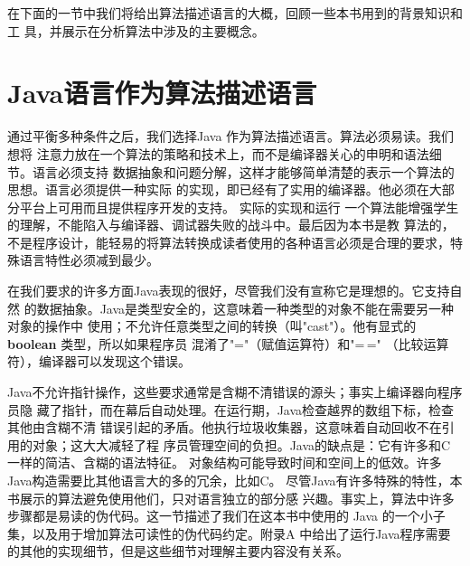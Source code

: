 在下面的一节中我们将给出算法描述语言的大概，回顾一些本书用到的背景知识和工
具，并展示在分析算法中涉及的主要概念。

\section{\textbf{Java}语言作为算法描述语言}
通过平衡多种条件之后，我们选择Java
作为算法描述语言。算法必须易读。我们想将
注意力放在一个算法的策略和技术上，而不是编译器关心的申明和语法细节。语言必须支持
数据抽象和问题分解，这样才能够简单清楚的表示一个算法的思想。语言必须提供一种实际
的实现，即已经有了实用的编译器。他必须在大部分平台上可用而且提供程序开发的支持。
实际的实现和运行
一个算法能增强学生的理解，不能陷入与编译器、调试器失败的战斗中。最后因为本书是教
算法的，不是程序设计，能轻易的将算法转换成读者使用的各种语言必须是合理的要求，特
殊语言特性必须减到最少。

在我们要求的许多方面Java表现的很好，尽管我们没有宣称它是理想的。它支持自然
的数据抽象。Java是类型安全的，这意味着一种类型的对象不能在需要另一种对象的操作中
使用；不允许任意类型之间的转换（叫"cast"）。他有显式的\textbf{boolean}
类型，所以如果程序员 混淆了"="（赋值运算符）和"=\,="
（比较运算符），编译器可以发现这个错误。

Java不允许指针操作，这些要求通常是含糊不清错误的源头；事实上编译器向程序员隐
藏了指针，而在幕后自动处理。在运行期，Java检查越界的数组下标，检查其他由含糊不清
错误引起的矛盾。他执行垃圾收集器，这意味着自动回收不在引用的对象；这大大减轻了程
序员管理空间的负担。Java的缺点是：它有许多和C一样的简洁、含糊的语法特征。
对象结构可能导致时间和空间上的低效。许多Java构造需要比其他语言大的多的冗余，比如C。
尽管Java有许多特殊的特性，本书展示的算法避免使用他们，只对语言独立的部分感
兴趣。事实上，算法中许多步骤都是易读的伪代码。这一节描述了我们在这本书中使用的
Java 的一个小子集，以及用于增加算法可读性的伪代码约定。附录A
中给出了运行Java程序需要的其他的实现细节，但是这些细节对理解主要内容没有关系。


